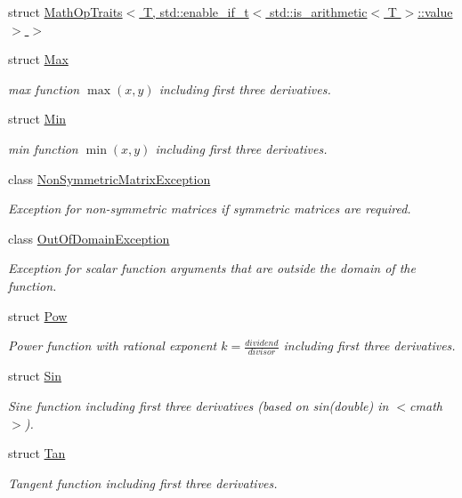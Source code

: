 \begin{DoxyCompactItemize}
\item 
struct \hyperlink{structFunG_1_1MathOpTraits_3_01T_00_01std_1_1enable__if__t_3_01std_1_1is__arithmetic_3_01T_01_4_1_1value_01_4_01_4}{Math\+Op\+Traits$<$ T, std\+::enable\+\_\+if\+\_\+t$<$ std\+::is\+\_\+arithmetic$<$ T $>$\+::value $>$ $>$}
\item 
struct \hyperlink{structFunG_1_1Max}{Max}
\begin{DoxyCompactList}\small\item\em max function $ \max(x,y) $ including first three derivatives. \end{DoxyCompactList}\item 
struct \hyperlink{structFunG_1_1Min}{Min}
\begin{DoxyCompactList}\small\item\em min function $ \min(x,y) $ including first three derivatives. \end{DoxyCompactList}\item 
class \hyperlink{classFunG_1_1NonSymmetricMatrixException}{Non\+Symmetric\+Matrix\+Exception}
\begin{DoxyCompactList}\small\item\em Exception for non-\/symmetric matrices if symmetric matrices are required. \end{DoxyCompactList}\item 
class \hyperlink{classFunG_1_1OutOfDomainException}{Out\+Of\+Domain\+Exception}
\begin{DoxyCompactList}\small\item\em Exception for scalar function arguments that are outside the domain of the function. \end{DoxyCompactList}\item 
struct \hyperlink{structFunG_1_1Pow}{Pow}
\begin{DoxyCompactList}\small\item\em Power function with rational exponent $ k = \frac{dividend}{divisor} $ including first three derivatives. \end{DoxyCompactList}\item 
struct \hyperlink{structFunG_1_1Sin}{Sin}
\begin{DoxyCompactList}\small\item\em Sine function including first three derivatives (based on sin(double) in $<$cmath$>$). \end{DoxyCompactList}\item 
struct \hyperlink{structFunG_1_1Tan}{Tan}
\begin{DoxyCompactList}\small\item\em Tangent function including first three derivatives. \end{DoxyCompactList}\item 

\end{DoxyCompactItemize}
